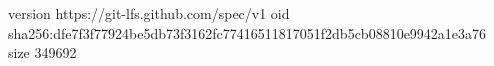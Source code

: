 version https://git-lfs.github.com/spec/v1
oid sha256:dfe7f3f77924be5db73f3162fc77416511817051f2db5cb08810e9942a1e3a76
size 349692
